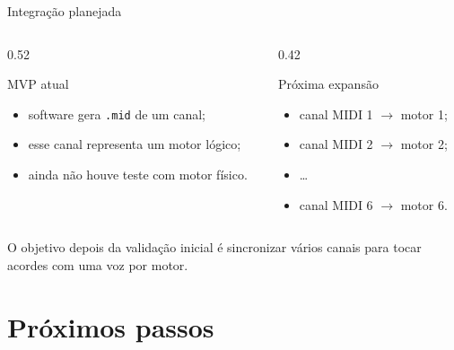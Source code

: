 \documentclass{beamer}
\begin{document}
\begin{frame}{Integração planejada}
    \begin{columns}[T,onlytextwidth]
        \begin{column}{0.52\textwidth}
            \begin{block}{MVP atual}
                \begin{itemize}
                    \item software gera \texttt{.mid} de um canal;
                    \item esse canal representa um motor lógico;
                    \item ainda não houve teste com motor físico.
                \end{itemize}
            \end{block}
        \end{column}
        \begin{column}{0.42\textwidth}
            \begin{block}{Próxima expansão}
                \begin{itemize}
                    \item canal MIDI 1 $\rightarrow$ motor 1;
                    \item canal MIDI 2 $\rightarrow$ motor 2;
                    \item \dots
                    \item canal MIDI 6 $\rightarrow$ motor 6.
                \end{itemize}
            \end{block}
        \end{column}
    \end{columns}

    \vspace{0.2cm}

    O objetivo depois da validação inicial é sincronizar vários canais para tocar
    acordes com uma voz por motor.
\end{frame}

\section{Próximos passos}
\end{document}
